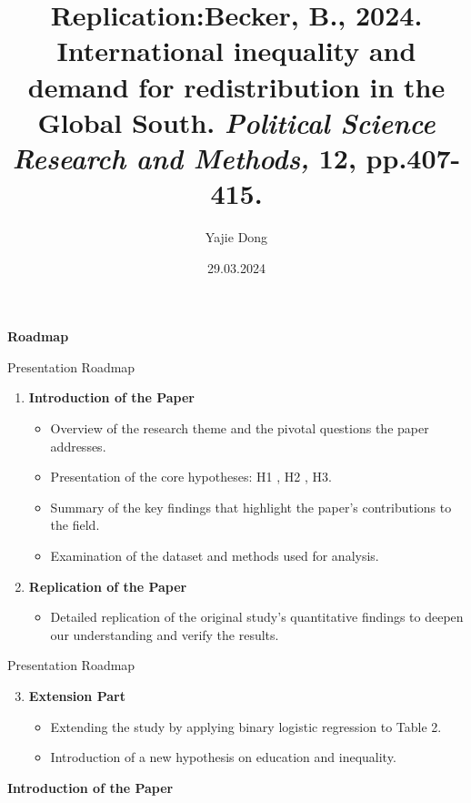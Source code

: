 \documentclass[aspectratio=169,10pt,compress]{beamer}
\title{Replication:Becker, B., 2024. International inequality and demand for redistribution in the Global South. \textit{Political Science Research and Methods,} 12, pp.407-415.}
\author{Yajie Dong}
\date{29.03.2024}
\begin{document}
\addtocounter{framenumber}{-1}
\frame[plain]{\titlepage}

\begin{frame}
\centering
\LARGE{\textbf{Roadmap}}
\end{frame}


\begin{frame}{Presentation Roadmap}
    \begin{enumerate}
        \item \textbf{Introduction of the Paper}
        \begin{itemize}
            \item Overview of the research theme and the pivotal questions the paper addresses.
            \item Presentation of the core hypotheses: H1 , H2 , H3.
            \item Summary of the key findings that highlight the paper's contributions to the field.
            \item Examination of the dataset and methods used for analysis.
        \end{itemize}
        \item \textbf{Replication of the Paper}
        \begin{itemize}
            \item Detailed replication of the original study’s quantitative findings to deepen our understanding and verify the results.
        \end{itemize}
     
    \end{enumerate}
\end{frame}
\begin{frame}{Presentation Roadmap}
    \begin{enumerate}
        \setcounter{enumi}{2} %
        \item \textbf{Extension Part}
        \begin{itemize}
            \item Extending the study by applying binary logistic regression to Table 2.
            \item Introduction of a new hypothesis on education and inequality.
            
        \end{itemize}
    \end{enumerate}
\end{frame}

\begin{frame}
\centering
\LARGE{\textbf{Introduction of the Paper}}
\end{frame}
\end{document}

